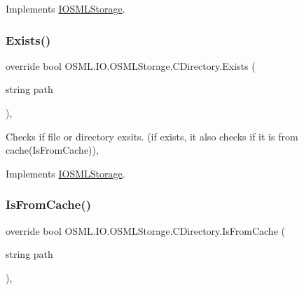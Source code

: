 Implements \mbox{\hyperlink{classIOSMLStorage_aca08055c799d8c86bfdc427c54b92993}{I\+O\+S\+M\+L\+Storage}}.

\mbox{\label{classOSML_1_1IO_1_1OSMLStorage_1_1CDirectory_ae4616522bb7f9a07084e461ea634965c}} 
\subsubsection{\texorpdfstring{Exists()}{Exists()}}
{\footnotesize\ttfamily override bool O\+S\+M\+L.\+I\+O.\+O\+S\+M\+L\+Storage.\+C\+Directory.\+Exists (\begin{DoxyParamCaption}\item[{string}]{path }\end{DoxyParamCaption})\hspace{0.3cm}{\ttfamily [inline]}, {\ttfamily [virtual]}}



Checks if file or directory exsits. (if exists, it also checks if it is from cache(\+Is\+From\+Cache)), 



Implements \mbox{\hyperlink{classIOSMLStorage_adc2fa33637c24f1a5c7f3e9dc746c5c6}{I\+O\+S\+M\+L\+Storage}}.

\mbox{\label{classOSML_1_1IO_1_1OSMLStorage_1_1CDirectory_a7d4783f478aab61af2df5b91c4cc3c7d}} 
\subsubsection{\texorpdfstring{IsFromCache()}{IsFromCache()}}
{\footnotesize\ttfamily override bool O\+S\+M\+L.\+I\+O.\+O\+S\+M\+L\+Storage.\+C\+Directory.\+Is\+From\+Cache (\begin{DoxyParamCaption}\item[{string}]{path }\end{DoxyParamCaption})\hspace{0.3cm}{\ttfamily [inline]}, {\ttfamily [virtual]}}




